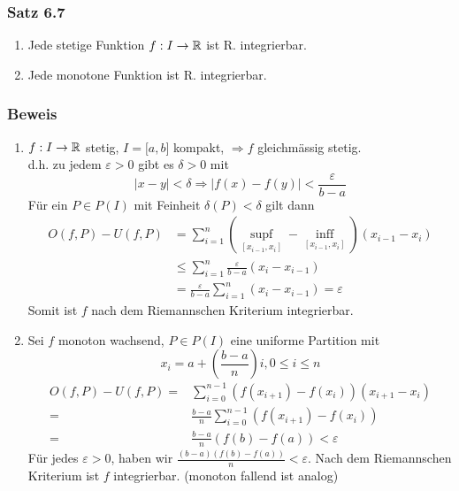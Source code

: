 \subsubsection*{Satz 6.7}
\begin{enumerate}
\item Jede stetige Funktion $f:I\to \mathbb{R}$ ist R. integrierbar.
\item Jede monotone Funktion ist R. integrierbar.
\end{enumerate}
\subsubsection*{Beweis}
\begin{enumerate}
\item $f:I\to\mathbb{R}$ stetig, $I=\lbrack a,b\rbrack$ kompakt, $\Rightarrow f$ gleichmässig stetig.\\
d.h. zu jedem $\varepsilon >0$ gibt es $\delta >0$ mit \[\left| {x - y} \right| < \delta  \Rightarrow \left| {f(x) - f(y)} \right| < \frac{\varepsilon }{{b - a}}\]
Für ein $P\in P(I)$ mit Feinheit $\delta(P)<\delta$ gilt dann
\begin{align*}
O(f,P)-U(f,P)&=\sum\limits_{i = 1}^n {(\mathop {\sup f}\limits_{[{x_{i - 1}},{x_i}]}  - \mathop {\inf f}\limits_{[{x_{i - 1}},{x_i}]} )} ({x_{i - 1}} - {x_i}) \\
&\le \sum\limits_{i = 1}^n {\frac{\varepsilon }{{b - a}}}({x_i} - {x_{i - 1}}) \\
&= \frac{\varepsilon }{{b - a}}\sum\limits_{i = 1}^n {({x_i} - {x_{i - 1}})}  = \varepsilon
\end{align*}
Somit ist $f$ nach dem Riemannschen Kriterium integrierbar.

\item Sei $f$ monoton wachsend, $P\in P(I)$ eine uniforme Partition mit \[x_i = a+\left(\frac{b-a}{n}\right)i, 0\leq i \leq n\]
\begin{align*}
O(f,P) - U(f,P) =&\sum\limits_{i = 0}^{n - 1} {(f({x_{i + 1}}) - f({x_i}))({x_{i + 1}} - {x_i})} \\
=&\frac{{b - a}}{n}\sum\limits_{i = 0}^{n - 1} {(f({x_{i + 1}}) - f({x_i}))} \\
=&\frac{{b - a}}{n}(f(b) - f(a)) < \varepsilon
\end{align*}
Für jedes $\varepsilon>0$, haben wir $\frac{{(b - a)(f(b) - f(a))}}{n} < \varepsilon$. Nach dem Riemannschen Kriterium ist $f$ integrierbar. (monoton fallend ist analog)
\end{enumerate}

